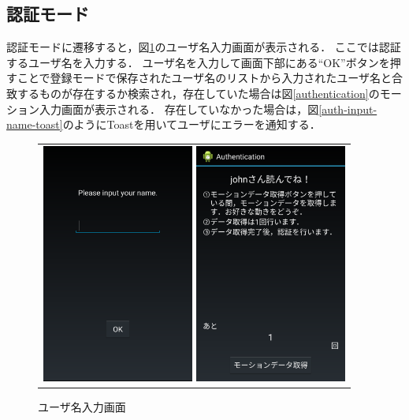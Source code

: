 \subsection{認証モード}
認証モードに遷移すると，図\ref{auth-input-name}のユーザ名入力画面が表示される．
ここでは認証するユーザ名を入力する．
ユーザ名を入力して画面下部にある``OK''ボタンを押すことで登録モードで保存されたユーザ名のリストから入力されたユーザ名と合致するものが存在するか検索され，存在していた場合は図\ref{authentication}のモーション入力画面が表示される．
存在していなかった場合は，図\ref{auth-input-name-toast}のようにToastを用いてユーザにエラーを通知する．

\begin{figure}[bthp]
  \centering
  \begin{tabular}{c}
    \begin{minipage}{0.33\hsize}
      \centering
      \includegraphics[bb=0 0 1080 1705, width=5cm]{Screenshots/auth-input-name.pdf}
      \caption{ユーザ名入力画面}
      \label{auth-input-name}
    \end{minipage}
    \begin{minipage}{0.33\hsize}
      \centering
      \includegraphics[bb=0 0 1080 1705, width=5cm]{Screenshots/authentication.pdf}

\end{minipage}
\end{tabular}
\end{figure}
